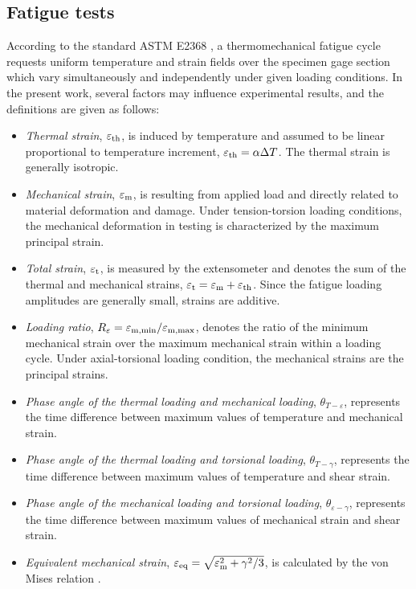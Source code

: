 \documentclass[preprint,5p,twocolumn,11pt,sort&compress]{elsarticle}
\begin{document}
\subsection{Fatigue tests}
According to the standard ASTM E2368 \cite{ASTM2014a}, a thermomechanical fatigue cycle requests uniform temperature and strain fields over the specimen gage section which vary simultaneously and independently under given loading conditions. In the present work, several factors may influence experimental results, and the definitions are given as follows:
\begin{itemize}
  \item {\em Thermal strain}, $\varepsilon_{\rm th}$, is induced by temperature and assumed to be linear proportional to temperature increment, $\varepsilon_{\rm th}=\alpha \Delta T$. The thermal strain is generally isotropic.
  \item {\em Mechanical strain}, $\varepsilon_{\rm m}$, is resulting from applied load and directly related to material deformation and damage. Under tension-torsion loading conditions, the mechanical deformation in testing is characterized by the maximum principal strain.
  \item {\em Total strain}, $\varepsilon_{\rm t}$, is measured by the extensometer and denotes the sum of the thermal and mechanical strains, $\varepsilon_{\rm t}=\varepsilon_{\rm m}+\varepsilon_{\rm th}$. Since the fatigue loading amplitudes are generally small, strains are additive.
  \item {\em Loading ratio}, $R_{\varepsilon}=\varepsilon_{\rm m,\min}/\varepsilon_{\rm m,\max}$, denotes the ratio of the minimum mechanical strain over the maximum mechanical strain within a loading cycle. Under axial-torsional loading condition, the mechanical strains are the principal strains.
  \item {\em Phase angle of the thermal loading and mechanical loading}, $\theta_{T-\varepsilon}$, represents the time difference between maximum values of temperature and mechanical strain. %
  \item {\em Phase angle of the thermal loading and torsional loading}, $\theta_{T-\gamma}$, represents the time difference between maximum values of temperature and shear strain.
  \item {\em Phase angle of the mechanical loading and torsional loading}, $\theta_{\varepsilon-\gamma}$, represents the time difference between maximum values of mechanical strain and shear strain.
  \item {\em Equivalent mechanical strain}, $\varepsilon_{\rm eq}=\sqrt {\varepsilon _{\rm m}^2 + {\gamma ^2}/3}$, is calculated by the von Mises relation \cite{Pol1991Cyclic}.
\end{itemize}
\end{document}
